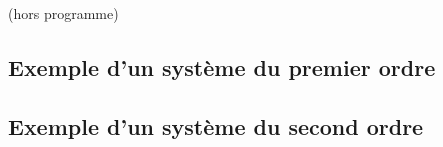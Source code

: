 (hors programme)
\acpl
\subsection{Exemple d'un système du premier ordre}
\acpl
\subsection{Exemple d'un système du second ordre}
\acpl

